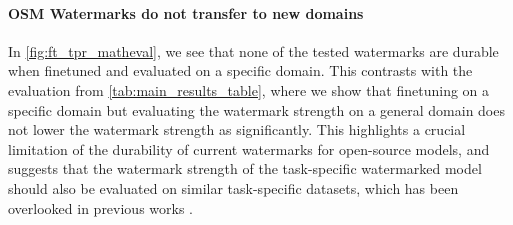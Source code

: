 

\paragraph{OSM Watermarks do not transfer to new domains}
In \cref{fig:ft_tpr_matheval}, we see that none of the tested watermarks are durable when finetuned and evaluated on a specific domain.
This contrasts with the evaluation from \cref{tab:main_results_table}, where we show that finetuning on a specific domain but evaluating the watermark strength on a general domain does not lower the watermark strength as significantly.
This highlights a crucial limitation of the durability of current watermarks for open-source models, and suggests that the watermark strength of the task-specific watermarked model should also be evaluated on similar task-specific datasets, which has been overlooked in previous works \citep{wapiti}.
